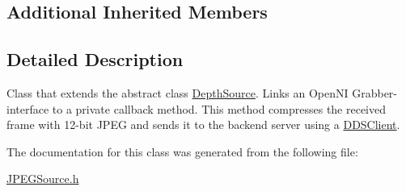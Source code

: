 \subsection*{Additional Inherited Members}


\subsection{Detailed Description}
Class that extends the abstract class \hyperlink{class_depth_source}{Depth\+Source}. Links an Open\+N\+I Grabber-\/interface to a private callback method. This method compresses the received frame with 12-\/bit J\+P\+E\+G and sends it to the backend server using a \hyperlink{class_d_d_s_client}{D\+D\+S\+Client}. 

The documentation for this class was generated from the following file\+:\begin{DoxyCompactItemize}
\item 
\hyperlink{_j_p_e_g_source_8h}{J\+P\+E\+G\+Source.\+h}\end{DoxyCompactItemize}
